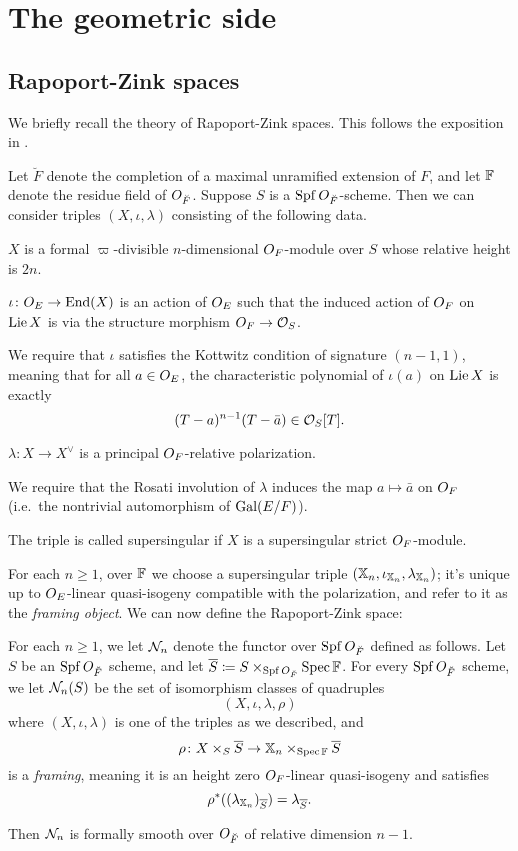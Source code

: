 \chapter{The geometric side}
\label{ch:geo}

\section{Rapoport-Zink spaces}
We briefly recall the theory of Rapoport-Zink spaces.
This follows the exposition in \cite[\S4.1]{ref:survey}.

Let $\breve F$ denote the completion of a maximal unramified extension of $F$,
and let $\mathbb F$ denote the residue field of $O_{\breve F}$.
Suppose $S$ is a $\operatorname{Spf} O_{\breve F}$-scheme.
Then we can consider triples $(X, \iota, \lambda)$ consisting of the following data.
\begin{itemize}
  \ii $X$ is a formal $\varpi$-divisible $n$-dimensional $O_F$-module over $S$
  whose relative height is $2n$.

  \ii $\iota \colon O_E \to \operatorname{End}(X)$ is an action of $O_E$
  such that the induced action of $O_F$ on $\operatorname{Lie} X$
  is via the structure morphism $O_F \to \mathcal{O}_S$.

  We require that $\iota$ satisfies the Kottwitz condition of signature $(n-1,1)$,
  meaning that for all $a \in O_E$,
  the characteristic polynomial of $\iota(a)$ on $\operatorname{Lie} X$
  is exactly \[ (T-a)^{n-1} (T-\bar a) \in \mathcal{O}_S[T]. \]

  \ii $\lambda \colon X \to X^\vee$ is a principal $O_F$-relative polarization.

  We require that the Rosati involution of $\lambda$
  induces the map $a \mapsto \bar a$ on $O_F$
  (i.e.\ the nontrivial automorphism of $\operatorname{Gal}(E/F)$).
\end{itemize}
The triple is called supersingular if $X$ is a supersingular strict $O_F$-module.

For each $n \ge 1$, over $\mathbb F$
we choose a supersingular triple $(\mathbb X_n, \iota_{\mathbb X_n}, \lambda_{\mathbb X_n})$;
it's unique up to $O_E$-linear quasi-isogeny compatible with the polarization,
and refer to it as the \emph{framing object}.
We can now define the Rapoport-Zink space:
\begin{definition}
  For each $n \ge 1$, we let $\mathcal N_n$ denote the
  functor over $\operatorname{Spf} O_{\breve F}$ defined as follows.
  Let $S$ be an $\operatorname{Spf} O_{\breve F}$ scheme, and let
  $\overline S \coloneqq S \times_{\operatorname{Spf} O_{\breve F}} \operatorname{Spec} \mathbb F$.
  For every $\operatorname{Spf} O_{\breve F}$ scheme, we let $\mathcal N_n(S)$
  be the set of isomorphism classes of quadruples
  \[ (X, \iota, \lambda, \rho) \]
  where $(X, \iota, \lambda)$ is one of the triples as we described, and
  \[ \rho \colon X \times_S \overline S \to \mathbb X_n \times_{\operatorname{Spec} \mathbb F} \overline S \]
  is a \emph{framing}, meaning it is an height zero $O_F$-linear quasi-isogeny
  and satisfies
  \[ \rho^\ast((\lambda_{\mathbb X_n})_{\overline S}) = \lambda_{\overline S}. \]
\end{definition}
Then $\mathcal N_n$ is formally smooth over $O_{\breve F}$ of relative dimension $n-1$.

